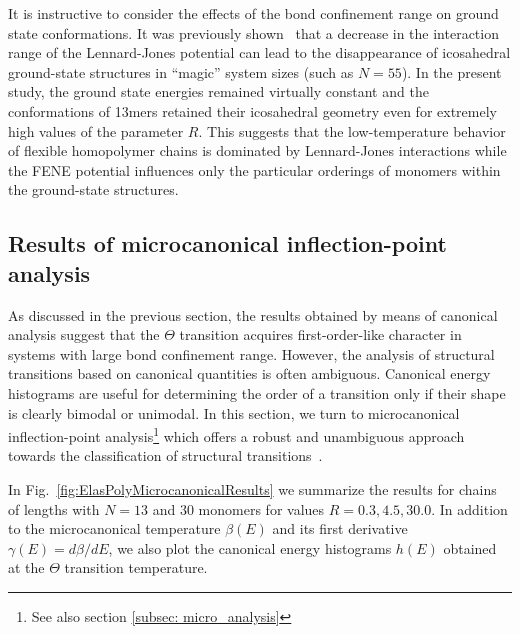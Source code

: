 \documentclass[12pt]{report}
\begin{document}
It is instructive to consider the effects of the bond confinement range on ground state conformations. It was previously shown~\cite{Gross2013} that a decrease in the interaction range of the Lennard-Jones potential can lead to the disappearance of icosahedral ground-state structures in ``magic'' system sizes (such as $N=55$). In the present study, the ground state energies remained virtually constant and the conformations of 13mers retained their icosahedral geometry even for extremely high values of the parameter $R$. This suggests that the low-temperature behavior of flexible homopolymer chains is dominated by Lennard-Jones interactions while the FENE potential influences only the particular orderings of monomers within the ground-state structures.

\subsection{Results of microcanonical inflection-point analysis}
%
As discussed in the previous section, the results obtained by means of canonical analysis suggest that the $\Theta$ transition acquires first-order-like character in systems with large bond confinement range. However, the analysis of structural transitions based on canonical quantities is often ambiguous. Canonical energy histograms are useful for determining the order of a transition only if their shape is clearly bimodal or unimodal. In this section, we turn to microcanonical inflection-point analysis\footnote{See also section \ref{subsec: micro_analysis}} which offers a robust and unambiguous approach towards the classification of structural transitions~\cite{Bachmann2014,Bachmann2013,Schnabel2011}. 

In Fig.~\ref{fig:ElasPolyMicrocanonicalResults} we summarize the results for chains of lengths with $N = 13$ and $30$ monomers for values $R = 0.3, 4.5, 30.0$. In addition to the microcanonical temperature $\beta(E)$ and its first derivative $\gamma(E) = d\beta/dE$, we also plot the canonical energy histograms $h(E)$ obtained at the $\Theta$ transition temperature. 
\end{document}
